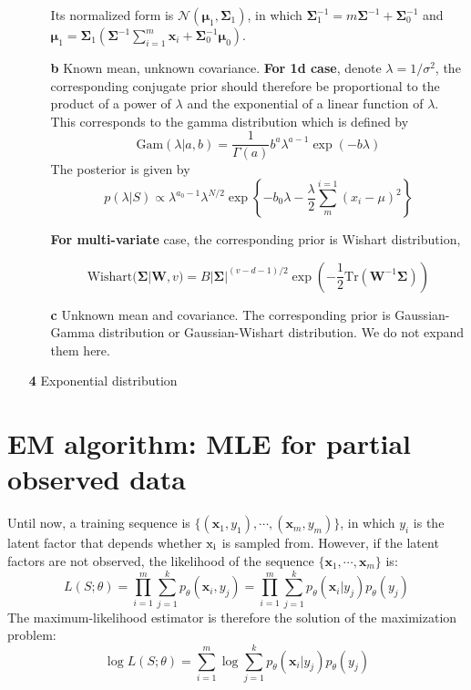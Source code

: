 \documentclass{article}
\begin{document}
\begin{itemize}
\begin{itemize}
	Its normalized form is $\mathcal{N}(\bm{\mu}_1,\bm{\Sigma}_1)$, in which $\bm{\Sigma}_1^{-1}=m\bm{\Sigma}^{-1} + \bm{\Sigma}_0^{-1}$ and $\bm{\mu}_1=\bm{\Sigma}_1(\bm{\Sigma}^{-1} \sum_{i=1}^m \bm{x}_i + \bm{\Sigma}_0^{-1} \bm{\mu}_0)$.

	\item [\textbf{b}] Known mean, unknown covariance. \textbf{For 1d case}, denote $\lambda=1/\sigma^2$, the corresponding conjugate prior should therefore be proportional to the product of a power of $\lambda$ and the exponential of a linear function of $\lambda$. This corresponds to the gamma distribution which is defined by
	\begin{equation*}
	\mathrm{Gam}(\lambda|a,b) = \frac{1}{\Gamma(a)} b^a \lambda^{a-1} \exp(-b\lambda)
	\end{equation*}
	The posterior is given by
	\begin{equation*}
	p(\lambda|S)\propto \lambda^{a_0-1} \lambda^{N/2} \exp \left\{-b_0 \lambda - \frac{\lambda}{2}\sum^{i=1}_m (x_i-\mu)^2\right\}
	\end{equation*}
	
	\textbf{For multi-variate} case, the corresponding prior is Wishart distribution,
	
	\begin{equation*}
	\mathrm{Wishart}(\bm{\Sigma}|\bm{W},v)=B|\bm{\Sigma}|^{(v-d-1)/2} \exp \left(-\frac{1}{2} \mathrm{Tr} (\bm{W}^{-1}\bm{\Sigma})\right)
	\end{equation*}
	
	\item [\textbf{c}] Unknown mean and covariance. The corresponding prior is Gaussian-Gamma distribution or Gaussian-Wishart distribution. We do not expand them here.
	
	\end{itemize}		
	
	\item [\textbf{4}] Exponential distribution
	\end{itemize}
	
\section{EM algorithm: MLE for partial observed data}
	Until now, a training sequence is $\{(\bm{x}_1,y_1),\cdots,(\bm{x}_m,y_m)\}$, in which $y_i$ is the latent factor that depends whether $\rm{x}_i$ is sampled from. However, if the latent factors are not observed, the likelihood of the sequence $\{\bm{x}_1,\cdots,\bm{x}_m\}$ is:
	\begin{equation*}
	L(S;\theta) = \prod_{i=1}^m \sum_{j=1}^k p_\theta(\bm{x}_i,y_j) = \prod_{i=1}^m \sum_{j=1}^k p_\theta(\bm{x}_i|y_j)p_\theta(y_j)
	\end{equation*}
	The maximum-likelihood estimator is therefore the solution of the maximization problem:
	\begin{equation}
	\log L(S;\theta) = \sum_{i=1}^m \log \sum_{j=1}^k p_\theta(\bm{x}_i|y_j)p_\theta(y_j)
	\end{equation}
	
\end{document}
